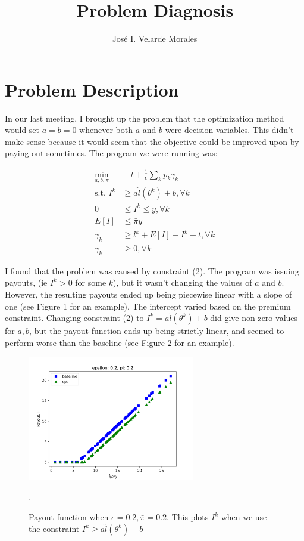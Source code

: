 \documentclass[11pt]{article}
\title{Problem Diagnosis}
\author{José I. Velarde Morales}
\begin{document}
\maketitle
\section{Problem Description}
In our last meeting, I brought up the problem that the optimization method would set $a=b=0$ whenever both $a$ and $b$ were decision variables. This didn't make sense because it would seem that the objective could be improved upon by paying out sometimes. The program we were running was: 

\begin{align}
    \min_{a,b,\pi} &\quad t + \frac{1}{\epsilon}\sum_k p_k \gamma_k\\
    \text{s.t.   } I^k &\geq a\hat{l}(\theta^k) + b, \forall k\\
    0 &\leq I^k \leq y, \forall k\\
    E[I] &\leq \bar{\pi}y\\
    \gamma_k &\geq l^k + E[I] -I^k -t, \forall k\\
    \gamma_k &\geq 0, \forall k
\end{align}

I found that the problem was caused by constraint (2). The program was issuing payouts, (ie $I^k >0$ for some $k$), but it wasn't changing the values of $a$ and $b$. However, the resulting payouts ended up being piecewise linear with a slope of one (see Figure 1 for an example). The intercept varied based on the premium constraint. Changing constraint (2) to $I^k = a\hat{l}(\theta^k) + b$ did give non-zero values for $a,b$, but the payout function ends up being strictly linear, and seemed to perform worse than the baseline (see Figure 2 for an example). 

\begin{figure}[H]
    \centering
    \includegraphics[width=0.65\textwidth]{eps_2_pi_2.png}
    \caption{Payout function when $\epsilon=0.2, \bar{\pi}=0.2$. This plots $I^k$ when we use the constraint $I^k \geq a\hat{l}(\theta^k) + b$}. 
\end{figure}
\end{document}
